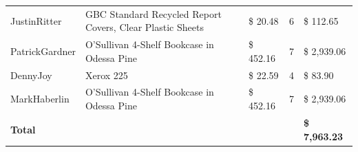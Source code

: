 \documentclass[11pt]{article} %
\begin{document}
\begin{table}[H]
\begin{tabular}{@{}lp{4cm}lll@{}}
JustinRitter                                                                            & GBC Standard Recycled Report Covers, Clear Plastic Sheets                                   & \$     20.48                                                                                 & 6                                                                                    & \$        112.65                                                                        \\
PatrickGardner                                                                          & O'Sullivan 4-Shelf Bookcase in Odessa Pine                                                  & \$   452.16                                                                                  & 7                                                                                    & \$     2,939.06                                                                         \\
DennyJoy                                                                                & Xerox 225                                                                                   & \$     22.59                                                                                 & 4                                                                                    & \$           83.90                                                                      \\
MarkHaberlin                                                                            & O'Sullivan 4-Shelf Bookcase in Odessa Pine                                                  & \$   452.16                                                                                  & 7                                                                                    & \$     2,939.06                                                                         \\
\textbf{Total}                                                                          & \textbf{}                                                                                   & \textbf{}                                                                                    & \textbf{}                                                                            & \textbf{\$     7,963.23}                                                                \\ \bottomrule
\end{tabular}
\end{table}
\end{document}
